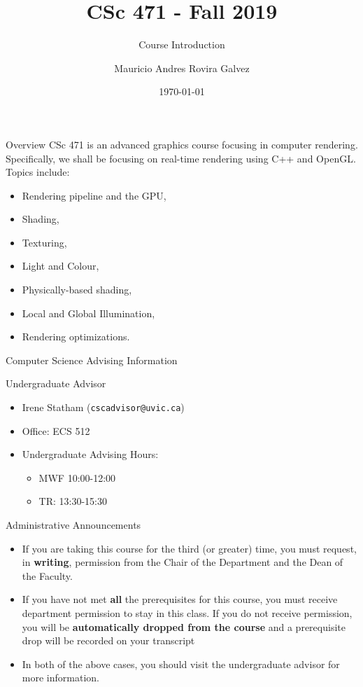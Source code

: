 \documentclass[11pt]{beamer}
\author{Mauricio Andres Rovira Galvez}
\title{CSc 471 - Fall 2019}
\subtitle{Course Introduction}
\institute{University of Victoria \\ Department of Computer Science}
\date{\today}
\begin{document}
  \begin{frame}
    \maketitle
  \end{frame}

  \begin{frame}{Overview}
    CSc 471 is an advanced graphics course focusing in computer rendering.
    Specifically, we shall be focusing on real-time rendering using C++ and
    OpenGL. Topics include:
    \begin{itemize}
      \item Rendering pipeline and the GPU,
      \item Shading,
      \item Texturing,
      \item Light and Colour,
      \item Physically-based shading,
      \item Local and Global Illumination,
      \item Rendering optimizations.
    \end{itemize}
  \end{frame}

  \begin{frame}{Computer Science Advising Information}
    \begin{block}{Undergraduate Advisor}
      \begin{itemize}
        \item Irene Statham (\texttt{cscadvisor@uvic.ca})
        \item Office: ECS 512
        \item Undergraduate Advising Hours:
          \begin{itemize}
            \item MWF 10:00-12:00
            \item TR: 13:30-15:30
          \end{itemize}
      \end{itemize}
    \end{block}
    \begin{block}{Administrative Announcements}
      \begin{itemize}
        \item {\tiny If you are taking this course for the third (or
          greater) time, you must request, in \textbf{writing}, permission from
        the Chair of the Department and the Dean of the Faculty.}
        \item {\tiny If you have not met \textbf{all} the prerequisites
            for this course, you must receive department permission to stay in
            this class.  If you do not receive permission, you will be
            \textbf{automatically dropped from the course} and a prerequisite
            drop will be recorded on your transcript}
        \item {\tiny In both of the above cases, you should visit the
          undergraduate advisor for more information.}
      \end{itemize}
    \end{block}
  \end{frame}
\end{document}

